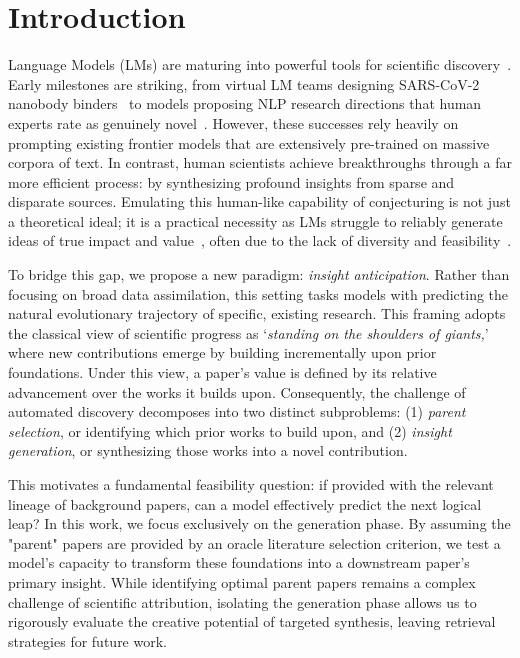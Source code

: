 \section{Introduction}
Language Models (LMs) are maturing into powerful tools for scientific discovery~\citep{karpathy2026autoresearch}. Early milestones are striking, from virtual LM teams designing SARS-CoV-2 nanobody binders~\citep{swanson2025virtual} to models proposing NLP research directions that human experts rate as genuinely novel~\citep{si2024can}. However, these successes rely heavily on prompting existing frontier models that are extensively pre-trained on massive corpora of text. In contrast, human scientists achieve breakthroughs through a far more efficient process: by synthesizing profound insights from sparse and disparate sources. Emulating this human-like capability of conjecturing is not just a theoretical ideal; it is a practical necessity as LMs struggle to reliably generate ideas of true impact and value~\citep{si2025ideation}, often due to the lack of diversity and feasibility~\citep{wadhwa2026createtestingllmsassociative}. 

To bridge this gap, we propose a new paradigm: \emph{insight anticipation}. Rather than focusing on broad data assimilation, this setting tasks models with predicting the natural evolutionary trajectory of specific, existing research. This framing adopts the classical view of scientific progress as `\emph{standing on the shoulders of giants,}' where new contributions emerge by building incrementally upon prior foundations. Under this view, a paper’s value is defined by its relative advancement over the works it builds upon. Consequently, the challenge of automated discovery decomposes into two distinct subproblems: (1) \textit{parent selection}, or identifying which prior works to build upon, and (2) \textit{insight generation}, or synthesizing those works into a novel contribution.

This motivates a fundamental feasibility question: if provided with the relevant lineage of background papers, can a model effectively predict the next logical leap? In this work, we focus exclusively on the generation phase. By assuming the "parent" papers are provided by an oracle literature selection criterion, we test a model's capacity to transform these foundations into a downstream paper’s primary insight. While identifying optimal parent papers remains a complex challenge of scientific attribution, isolating the generation phase allows us to rigorously evaluate the creative potential of targeted synthesis, leaving retrieval strategies for future work.

